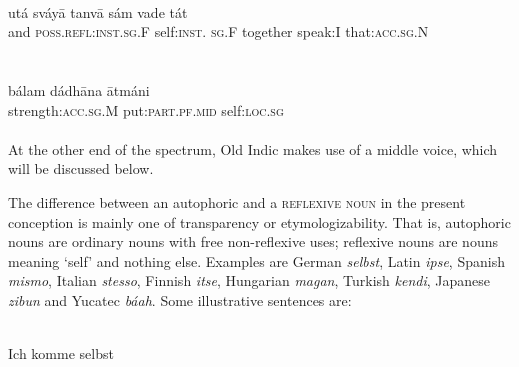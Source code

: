\ea\label{ex:12}
\\
\gll utá  sváy\=a  tanv\=a  sám  vade  tát\\
 and  \textsc{poss}.\textsc{refl}:\textsc{inst}.\textsc{sg}.F  self:\textsc{inst}. \textsc{sg}.F  together  speak:I  that:\textsc{acc}.\textsc{sg}.N\\
\\
\z
\noindent \ea\label{ex:13}
 \\
\gll bálam  dádh\=ana  \=atmáni\\
strength:\textsc{acc}.\textsc{sg}.M  put:\textsc{part}.\textsc{pf}.\textsc{mid}  self:\textsc{loc}.\textsc{sg}\\
\\
\z
\noindent At the other end of the spectrum, Old Indic makes use of a middle voice, which will be discussed below.

The difference between an autophoric and a \textsc{reflexive noun} in the present conception is mainly one of transparency or etymologizability. That is, autophoric nouns are ordinary nouns with free non-reflexive uses; reflexive nouns are nouns meaning ‘self’ and nothing else. Examples are German \textit{selbst}, Latin \textit{ipse}, Spanish \textit{mismo}, Italian \textit{stesso}, Finnish \textit{itse}, Hungarian \textit{magan}, Turkish \textit{kendi}, Japanese \textit{zibun} and Yucatec \textit{báah}. Some illustrative sentences are:

\ea\label{ex:E14}
\langinfo{\LangGerm}{}{}\\
 \ea
 Ich komme selbst\\
  
